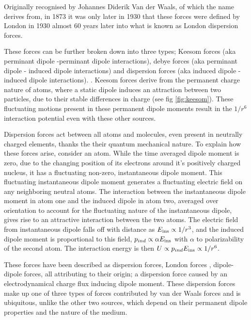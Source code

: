 Originally recognised by Johannes Diderik Van der Waals, of which the name derives from, in 1873 \cite{vanderWaals} it was only later in 1930 that these forces were defined by London in 1930\cite{London} almost 60 years later into what is known as London dispersion forces. 

These forces can be further broken down into three types;  Keesom forces (aka perminant dipole -perminant dipole interactions), debye forces (aka perminant dipole - induced dipole interactions) and dispersion forces (aka induced dipole - induced dipole interactions). \cite{sciDirBook}. Keesom forces derive from the permanent charge nature of atoms, where a static dipole induces an attraction between two particles, due to their stable differences in charge (see fig \ref{fig:keesom}). These fluctuating motions present in these permanent dipole moments result in the $1/r^6$ interaction potential even with these other sources.

Dispersion forces act between all atoms and molecules, even present in neutrally charged elements, thanks the their quantum mechanical nature. To explain how these forces arise, consider an atom. While the time averaged dipole moment is zero, due to the changing position  of its electrons around it's positively charged nucleus, it has a fluctuating non-zero, instantaneous dipole moment. This fluctuating instantaneous dipole moment generates a fluctuating electric field on any neighboring neutral atoms. The interaction between the instantaneous dipole moment in atom one and the induced dipole in atom two, averaged over orientation to account for the fluctuating nature of the instantaneous dipole, gives rise to an attractive interaction between the two atoms. The electric field from instantaneous dipole falls off with distance as $E_{\rm ins} \propto 1/r^3$, and the induced dipole moment is proportional to this field, $p_{ind} \propto \alpha E_{\rm ins}$ with $\alpha$ to polarizability of the second atom. The interaction energy is then $U \propto p_{ind}E_{\rm ins} \propto 1/r^6$. 

These forces have been described as dispersion forces, London forces \cite{London}, dipole-dipole forces, all attributing to their origin; a dispersion force caused by an electrodynamical charge flux inducing dipole moment. These dispersion forces make up one of three types of forces contributed by van der Waals forces and is ubiquitous, unlike the other two sources, which depend on their permanent dipole properties and the nature of the medium. \cite{IsGreenBook}

